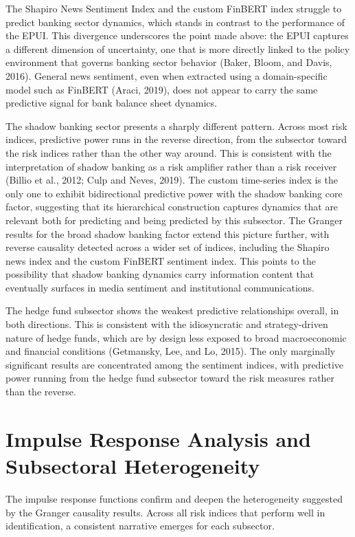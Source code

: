 \documentclass[12pt,a4paper]{report}\usepackage[a4paper, top=2.5cm, bottom=2.5cm, left=2.5cm, right=2.5cm]{geometry}
\begin{document}
The Shapiro News Sentiment Index and the custom FinBERT index struggle to
predict banking sector dynamics, which stands in contrast to the performance of
the EPUI. This divergence underscores the point made above: the EPUI captures
a different dimension of uncertainty, one that is more directly linked to the
policy environment that governs banking sector behavior (Baker, Bloom, and Davis,
2016). General news sentiment, even when extracted using a domain-specific model
such as FinBERT (Araci, 2019), does not appear to carry the same predictive
signal for bank balance sheet dynamics.

The shadow banking sector presents a sharply different pattern. Across most
risk indices, predictive power runs in the reverse direction, from the subsector
toward the risk indices rather than the other way around. This is consistent
with the interpretation of shadow banking as a risk amplifier rather than a
risk receiver (Billio et al., 2012; Culp and Neves, 2019). The custom time-series
index is the only one to exhibit bidirectional predictive power with the shadow
banking core factor, suggesting that its hierarchical construction captures dynamics
that are relevant both for predicting and being predicted by this subsector. The
Granger results for the broad shadow banking factor extend this picture further,
with reverse causality detected across a wider set of indices, including the Shapiro
news index and the custom FinBERT sentiment index. This points to the possibility
that shadow banking dynamics carry information content that eventually surfaces
in media sentiment and institutional communications.

The hedge fund subsector shows the weakest predictive relationships overall,
in both directions. This is consistent with the idiosyncratic and strategy-driven
nature of hedge funds, which are by design less exposed to broad macroeconomic
and financial conditions (Getmansky, Lee, and Lo, 2015). The only marginally
significant results are concentrated among the sentiment indices, with predictive
power running from the hedge fund subsector toward the risk measures rather than
the reverse.

\section{Impulse Response Analysis and Subsectoral Heterogeneity}

The impulse response functions confirm and deepen the heterogeneity suggested
by the Granger causality results. Across all risk indices that perform well in
identification, a consistent narrative emerges for each subsector.
\end{document}
